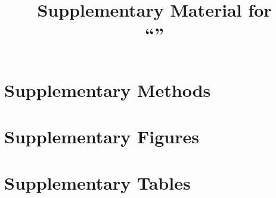 \documentclass[\ThesisClassOptions]{article}
\title{Supplementary Material for\\``\ThesisTitleEN''}
\author{\ThesisAuthorEN}
\date{\ThesisSubmissionDateEN}
\begin{document}
\maketitle

\section*{Supplementary Methods}

\section*{Supplementary Figures}


\section*{Supplementary Tables}

%   



\end{document}
